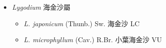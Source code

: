 
  \begin{itemize}
 \item[] \textit{Lygodium} 海金沙屬
                                
  \begin{itemize}
        \item[] \textit{L. japonicum} (Thunb.) Sw.  海金沙   LC
        \item[] \textit{L. microphyllum} (Cav.) R.Br.  小葉海金沙   VU
  \end{itemize}
  \end{itemize}
